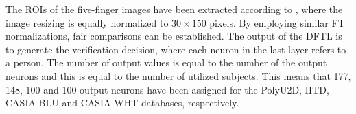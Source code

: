 \documentclass[conference]{IEEEtran}
\begin{document}
The ROIs of the five-finger images have been extracted according to \cite{Al-Nima2017Robust, Al-Nima2017finger}, where the image resizing is equally normalized to $30\times 150$ pixels. By employing similar FT normalizations, fair comparisons can be established. 
The output of the DFTL is to generate the verification decision, where each neuron in the last layer refers to a person. The number of output values is equal to the number of the output neurons and this is equal to the number of utilized subjects. This means that 177, 148, 100 and 100 output neurons have been assigned for the PolyU2D, IITD, CASIA-BLU and CASIA-WHT databases, respectively. 
\end{document}

